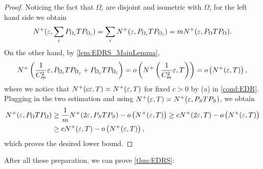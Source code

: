 \begin{proof}
  Noticing the fact that $\Omega_i$ are disjoint and isometric with $\Omega$, for the left hand side we obtain
  \begin{align*}
    N^+(\varepsilon, \sum_{i} P_{\Omega_i} T P_{\Omega_i}) = \sum_{i} N^+(\varepsilon, P_{\Omega_i} T P_{\Omega_i})
    = m N^+(\varepsilon, P_{\Omega} T P_{\Omega}).
  \end{align*}
  On the other hand, by \cref{lem:EDRS_MainLemma},
  \begin{align*}
    N^+\left( \frac{1}{C_m^2}\varepsilon,  P_{\Omega_i} T P_{\Omega_j} + P_{\Omega_j} T P_{\Omega_i} \right)
    = o\left( N^+\left(\frac{1}{C_m^2}\varepsilon, T\right) \right) = o\left( N^+(\varepsilon,T) \right),
  \end{align*}
  where we notice that $N^+(c \varepsilon, T) \asymp N^+(\varepsilon,T)$ for fixed $c > 0$ by (a) in \cref{cond:EDR}.
  Plugging in the two estimation and using $N^+(\varepsilon,T) \asymp  N^+(\varepsilon,  P_{S} T P_{S})$, we obtain
  \begin{align*}
    N^+(\varepsilon, P_{\Omega} T P_{\Omega})
    & \geq \frac{1}{m}N^+(2\varepsilon,  P_{S} T P_{S}) - o\left( N^+(\varepsilon,T) \right)
    \geq c N^+(2 \varepsilon,T) - o\left( N^+(\varepsilon,T) \right) \\
    & \geq c N^+(\varepsilon,T) - o\left( N^+(\varepsilon,T) \right),
  \end{align*}
  which proves the desired lower bound.
\end{proof}



After all these preparation, we can prove \cref{thm:EDRS}:

